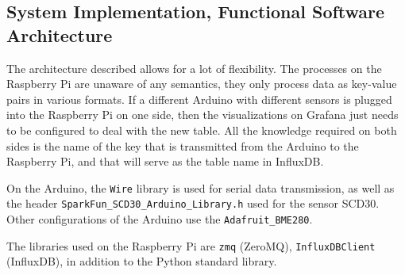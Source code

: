 \subsection{System Implementation, Functional Software Architecture}

The architecture described allows for a lot of flexibility. The processes on the Raspberry Pi are unaware of any semantics, they only process data as key-value pairs in various formats. If a different Arduino with different sensors is plugged into the Raspberry Pi on one side, then the visualizations on Grafana just needs to be configured to deal with the new table. All the knowledge required on both sides is the name of the key that is transmitted from the Arduino to the Raspberry Pi, and that will serve as the table name in InfluxDB.

On the Arduino, the \texttt{Wire} library is used for serial data transmission, as well as the header \texttt{SparkFun\_SCD30\_Arduino\_Library.h} used for the sensor SCD30. Other configurations of the Arduino use the \texttt{Adafruit\_BME280}.

The libraries used on the Raspberry Pi are \texttt{zmq} (ZeroMQ), \texttt{InfluxDBClient} (InfluxDB), in addition to the Python standard library.
